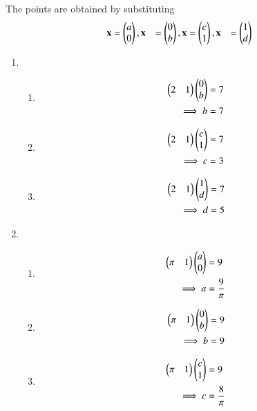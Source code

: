 The points are obtained by substituting
\begin{align}
\mathbf{x} &= \begin{pmatrix}a\\0\end{pmatrix},
\mathbf{x} &=\begin{pmatrix}0\\b\end{pmatrix},
\mathbf{x} &= \begin{pmatrix}c\\1\end{pmatrix},
\mathbf{x} &= \begin{pmatrix}1\\d\end{pmatrix}
\end{align}
\begin{enumerate}
%
\item 
\begin{enumerate}
\begin{align}
\myvec{2&1}\myvec{a\\0} &= 7 \\
\implies a&=\frac{7}{2}
\end{align}
\item 
%
\begin{align}
\begin{pmatrix}2&1\end{pmatrix}\begin{pmatrix}0\\b\end{pmatrix} &= 7 \\
\implies b&=7
\end{align}
\item 
\begin{align}
\begin{pmatrix}2&1\end{pmatrix}\begin{pmatrix}c\\1\end{pmatrix} &= 7 \\
\implies c&=3  
\end{align}
\item
\begin{align}
\begin{pmatrix}2&1\end{pmatrix}\begin{pmatrix}1\\d\end{pmatrix} &= 7 \\
\implies d&=5 
\end{align}
\end{enumerate}
\item 
\begin{enumerate}
\item 
\begin{align}
\begin{pmatrix}\pi&1\end{pmatrix}\begin{pmatrix}a\\0\end{pmatrix} &= 9 \\
\implies a&=\frac{9}{\pi} 
\end{align}

\item 
\begin{align}
\begin{pmatrix}\pi&1\end{pmatrix}\begin{pmatrix}0\\b\end{pmatrix} &= 9 \\
\implies b&=9
\end{align}

\item 
\begin{align}
\begin{pmatrix}\pi&1\end{pmatrix}\begin{pmatrix}c\\1\end{pmatrix} &= 9 \\
\implies c&=\frac{8}{\pi}  
\end{align}


\end{enumerate}
\end{enumerate}
